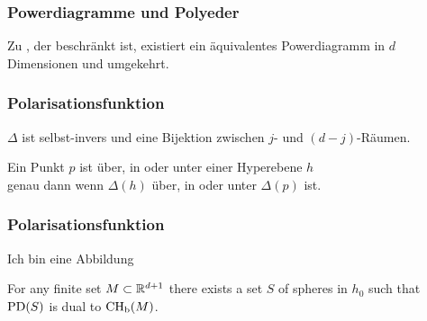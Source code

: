 
\begin{frame}
    \frametitle{Powerdiagramme und Polyeder}

    \begin{theorem}
        Zu , der  beschränkt ist, existiert ein äquivalentes Powerdiagramm in $d$ Dimensionen und umgekehrt.
    \end{theorem}
\end{frame}

\begin{frame}
    \frametitle{Polarisationsfunktion}

    \begin{lemma}
        $\Delta$ ist selbst-invers und eine Bijektion zwischen $j$- und $(d-j)$-Räumen.
    \end{lemma}

    \vfill

    \begin{lemma}
        Ein Punkt $p$ ist über, in oder unter einer Hyperebene $h$\\ genau dann wenn $\Delta(h)$ über, in oder unter $\Delta(p)$ ist.
    \end{lemma}
\end{frame}

\begin{frame}
    \frametitle{Polarisationsfunktion}

    Ich bin eine Abbildung
    \begin{theorem}
        For any finite set $M \subset \mathbb{R}^{d+1}$ there exists a set $S$ of spheres in $h_0$ such that $\operatorname{PD}(S)$ is dual to $\operatorname{CH_b}(M)$.
    \end{theorem}
\end{frame}

